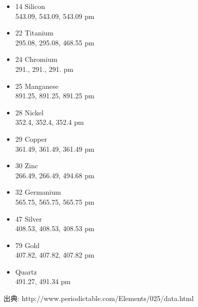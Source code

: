 \documentclass[11pt]{article}
\begin{document}
\begin{itemize}
\item 14 Silicon \\
543.09, 543.09, 543.09 pm
\item  22 Titanium \\
 295.08, 295.08, 468.55 pm
\item  24 Chromium\\
 291., 291., 291. pm
\item  25 Manganese\\
 891.25, 891.25, 891.25 pm
\item  28 Nickel\\
 352.4, 352.4, 352.4 pm
\item  29 Copper\\
 361.49, 361.49, 361.49 pm
\item  30 Zinc\\
 266.49, 266.49, 494.68 pm
\item  32 Germanium\\
 565.75, 565.75, 565.75 pm
\item  47 Silver\\
 408.53, 408.53, 408.53 pm
\item  79 Gold\\
 407.82, 407.82, 407.82 pm 
\item Quartz \\
 491.27, 491.34 pm 
\end {itemize}
出典: http://www.periodictable.com/Elements/025/data.html



\end{document}
